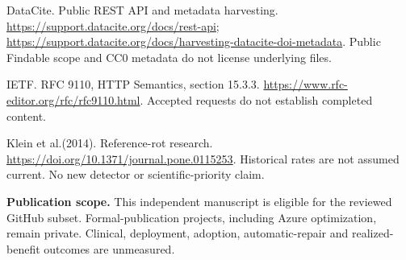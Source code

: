 \documentclass[11pt]{article}
\begin{document}
DataCite. Public REST API and metadata harvesting. \url{https://support.datacite.org/docs/rest-api}; \url{https://support.datacite.org/docs/harvesting-datacite-doi-metadata}. Public Findable scope and CC0 metadata do not license underlying files.

IETF. RFC 9110, HTTP Semantics, section 15.3.3. \url{https://www.rfc-editor.org/rfc/rfc9110.html}. Accepted requests do not establish completed content.

Klein et al.(2014). Reference-rot research. \url{https://doi.org/10.1371/journal.pone.0115253}. Historical rates are not assumed current. No new detector or scientific-priority claim.

\normalsize\textbf{Publication scope.} This independent manuscript is eligible for the reviewed GitHub subset. Formal-publication projects, including Azure optimization, remain private. Clinical, deployment, adoption, automatic-repair and realized-benefit outcomes are unmeasured.
\end{document}
